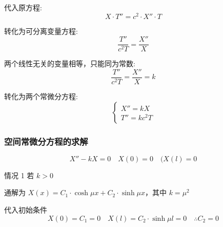 \documentclass[12pt,a4paper]{article}
\numberwithin{subsection}{section}   %
\numberwithin{subsubsection}{subsection}
\theoremstyle{plain}
\theoremstyle{definition}
\theoremstyle{remark}
\theoremstyle{remark}
\begin{document}
	代入原方程:
	\begin{equation} \label{eq:original_substitution}
		X \cdot T'' = c^2 \cdot X'' \cdot T
	\end{equation}
	
	转化为可分离变量方程:
	\begin{equation} \label{eq:separation}
		\frac{T''}{c^2 T} = \frac{X''}{X}
	\end{equation}
	
	两个线性无关的变量相等，只能同为常数:
	\begin{equation} \label{eq:constant}
		\frac{T''}{c^2 T} = \frac{X''}{X} = k
	\end{equation}
	
	转化为两个常微分方程:
	\begin{equation} \label{eq:ode}
		\begin{cases}
			X'' = kX \\
			T'' = k c^2 T
		\end{cases}
	\end{equation}
	
	\subsubsection{空间常微分方程的求解}
	\begin{equation}
		X'' - kX = 0 \quad X(0) = 0 \quad (X(l) = 0
	\end{equation}
	
情况 1 \quad 若 \(k > 0\)

通解为 \(X(x) = C_1 \cdot \cosh \mu x + C_2 \cdot \sinh \mu x\)，其中 \(k = \mu^2\)
	
	代入初始条件 
	\begin{equation}
		X(0) = C_1 = 0 \quad X(l) = C_2 \cdot \sinh \mu l = 0 \quad \therefore C_2 = 0
	\end{equation}
	
\end{document}
